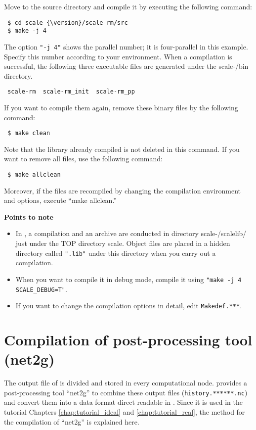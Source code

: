 Move to the \scalerm source directory
and compile it by executing the following command:
\begin{verbatim}
 $ cd scale-{\version}/scale-rm/src
 $ make -j 4
\end{verbatim}
The option \verb|"-j 4"| shows the parallel number;
it is four-parallel in this example.
Specify this number according to your environment.
When a compilation is successful,
the following three executable files are generated under the scale-{\version}/bin directory.
\begin{verbatim}
 scale-rm  scale-rm_init  scale-rm_pp
\end{verbatim}

If you want to compile them again, remove these binary files by the following command:
\begin{verbatim}
 $ make clean
\end{verbatim}
Note that the library already compiled is not deleted in this command. If you want to remove all files, use the following command:
\begin{verbatim}
 $ make allclean
\end{verbatim}
Moreover, if the files are recompiled by changing the compilation environment and options,
execute ``make allclean.''

{\bf Points to note}
\begin{itemize}
\item  In \scalelib, a compilation and an archive are conducted in directory scale-{\version}/scalelib/ just under the TOP directory scale.
Object files are placed in a hidden directory called \verb|".lib"| under this directory when you carry out a compilation.
\item  When you want to compile it in debug mode,
compile it using \verb|"make -j 4 SCALE_DEBUG=T"|.
\item If you want to change the compilation options in detail, edit \verb|Makedef.***|.
\end{itemize}


\section{Compilation of post-processing tool (net2g)} \label{sec:source_net2g}

The output file of \scalerm is divided and stored in every computational node.
\scalelib provides a post-processing tool ``net2g''  to combine these output files
(\verb|history.******.nc|)
and convert them into a data format direct readable in \grads.
Since it is used in the tutorial Chapters \ref{chap:tutorial_ideal} and \ref{chap:tutorial_real}, the method for the compilation of ``net2g'' is explained here.

